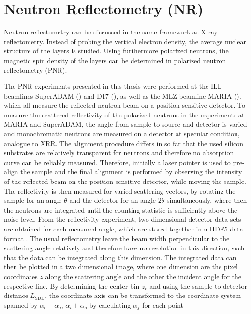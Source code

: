 \documentclass[\main/dresen_thesis.tex]{subfiles}
\begin{document}
  \section{Neutron Reflectometry (NR)}
    \label{app:methods:nr}
    Neutron reflectometry can be discussed in the same framework as X-ray reflectometry.
    Instead of probing the vertical electron density, the average nuclear structure of the layers is studied.
    Using furthermore polarized neutrons, the magnetic spin density of the layers can be determined in polarized neutron reflectometry (PNR).

    The PNR experiments presented in this thesis were performed at the ILL beamlines SuperADAM () and D17 (), as well as the MLZ beamline MARIA (), which all measure the reflected neutron beam on a position-sensitive detector.
    To measure the scattered reflectivity of the polarized neutrons in the experiments at MARIA and SuperADAM, the angle from sample to source and detector is varied and monochromatic neutrons are measured on a detector at specular condition, analogue to XRR.
    The alignment procedure differs in so far that the used silicon substrates are relatively transparent for neutrons and therefore no absorption curve can be reliably measured.
    Therefore, initially a laser pointer is used to pre-align the sample and the final alignment is performed by observing the intensity of the reflected beam on the position-sensitive detector, while moving the sample.
    The reflectivity is then measured for varied scattering vectors, by rotating the sample for an angle $\theta$ and the detector for an angle $2 \theta$ simultaneously, where then the neutrons are integrated until the counting statistic is sufficiently above the noise level.
    From the reflectivity experiment, two-dimensional detector data sets are obtained for each measured angle, which are stored together in a HDF5 data format \cite{HDF5_1997_Hiera}.
    The usual reflectometry leave the beam width perpendicular to the scattering angle relatively and therefore have no resolution in this direction, such that the data can be integrated along this dimension.
    The integrated data can then be plotted in a two dimensional image, where one dimension are the pixel coordinates $z$ along the scattering angle and the other the incident angle for the respective line.
    By determining the center bin $z_c$ and using the sample-to-detector distance $L_\mathrm{SDD}$, the coordinate axis can be transformed to the coordinate system spanned by $\alpha_i - \alpha_o,\,\alpha_i+\alpha_o$ by calculating $\alpha_f$ for each point
\end{document}
